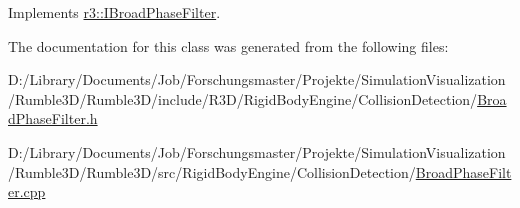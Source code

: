 Implements \mbox{\hyperlink{classr3_1_1_i_broad_phase_filter_a5f437f6390a8f10bf96d72e35e3b4432}{r3\+::\+I\+Broad\+Phase\+Filter}}.



The documentation for this class was generated from the following files\+:\begin{DoxyCompactItemize}
\item 
D\+:/\+Library/\+Documents/\+Job/\+Forschungsmaster/\+Projekte/\+Simulation\+Visualization/\+Rumble3\+D/\+Rumble3\+D/include/\+R3\+D/\+Rigid\+Body\+Engine/\+Collision\+Detection/\mbox{\hyperlink{_broad_phase_filter_8h}{Broad\+Phase\+Filter.\+h}}\item 
D\+:/\+Library/\+Documents/\+Job/\+Forschungsmaster/\+Projekte/\+Simulation\+Visualization/\+Rumble3\+D/\+Rumble3\+D/src/\+Rigid\+Body\+Engine/\+Collision\+Detection/\mbox{\hyperlink{_broad_phase_filter_8cpp}{Broad\+Phase\+Filter.\+cpp}}\end{DoxyCompactItemize}
